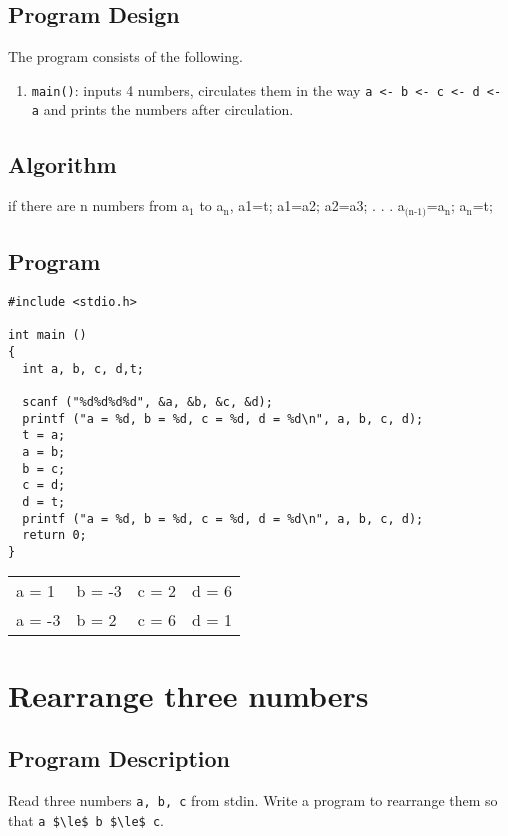 \documentclass[11pt]{article}
\begin{document}
\subsection*{Program Design}
\label{sec-9-2}
The program consists of the following.
\begin{enumerate}
\item \texttt{main()}: inputs 4 numbers, circulates them in the way \texttt{a <- b <- c <- d <- a} and prints the numbers after circulation.
\end{enumerate}

\subsection*{Algorithm}
\label{sec-9-3}
if there are n numbers from a$_{\text{1}}$ to a$_{\text{n}}$,
  a1=t;
  a1=a2;
  a2=a3;
  .
  .
  .
  a$_{\text{(n-1)}}$=a$_{\text{n}}$;
  a$_{\text{n}}$=t;

\subsection*{Program}
\label{sec-9-4}
\begin{verbatim}
#include <stdio.h>

int main ()
{
  int a, b, c, d,t;

  scanf ("%d%d%d%d", &a, &b, &c, &d);
  printf ("a = %d, b = %d, c = %d, d = %d\n", a, b, c, d);
  t = a;
  a = b;
  b = c;
  c = d;
  d = t;
  printf ("a = %d, b = %d, c = %d, d = %d\n", a, b, c, d);
  return 0;
}
\end{verbatim}

\begin{center}
\begin{tabular}{llll}
a = 1 & b = -3 & c = 2 & d = 6\\
a = -3 & b = 2 & c = 6 & d = 1\\
\end{tabular}
\end{center}

\section{Rearrange three numbers}
\label{sec-10}

\subsection*{Program Description}
\label{sec-10-1}
Read three numbers \texttt{a, b, c} from stdin. Write a program to rearrange them so that \texttt{a \$\textbackslash{}le\$ b \$\textbackslash{}le\$ c}.
\end{document}
